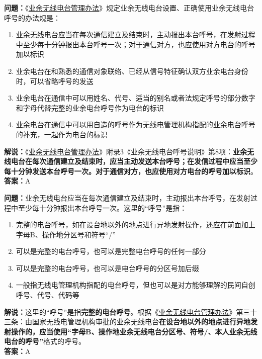 \textbf{问题：}《\href{https://www.miit.gov.cn/jgsj/zfs/bmgz/art/2020/art_147b69815b3641caad9047735f94c860.html}{业余无线电台管理办法}》规定业余无线电台设置、正确使用业余无线电台呼号的办法规是：
\begin{enumerate}[label=\Alph*), leftmargin=1cm]
	\item 业余无线电台应当在每次通信建立及结束时，主动报出本台呼号，在发射过程中至少每十分钟报出本台呼号一次；对于通信对方，也应使用对方电台的呼号加以标识
	\item 业余电台在和熟悉的通信对象联络、已经从信号特征确认双方业余电台身份时，可以省略呼号的发送
	\item 业余电台在通信中可以用姓名、代号、适当的别名或者法规定呼号的部分数字和字母代替完整的业余电台呼号作为电台的标识
	\item 业余电台在通信中可以用自造的呼号作为无线电管理机构指配的业余电台呼号的补充，一起作为电台的标识
\end{enumerate}
\textbf{解说：}《\href{https://www.miit.gov.cn/jgsj/zfs/bmgz/art/2020/art_147b69815b3641caad9047735f94c860.html}{业余无线电台管理办法}》附录3《业余无线电台呼号说明》第8项：\textbf{业余无线电台在每次通信建立及结束时，应当主动发送本台呼号；在发信过程中应当至少每十分钟发送本台呼号一次。对于通信对方，也应使用对方电台的呼号加以标识}。\\\textbf{答案：}A

\textbf{问题：}业余无线电台应当在每次通信建立及结束时，主动报出本台呼号，在发射过程中至少每十分钟报出本台呼号一次。这里的“呼号”是指：
\begin{enumerate}[label=\Alph*), leftmargin=1cm]
	\item 完整的电台呼号，如在设台地以外的地点进行异地发射操作，还应在前面加上字母B、操作地分区号和符号“/”
	\item 可以是完整的电台呼号，也可以是完整电台呼号的任何一部分
	\item 可以是完整的电台呼号，也可以是电台呼号的分区号加后缀
	\item 一般指无线电管理机构指配的电台呼号，但也可以是对方能够理解的民间自创呼号、代号、代码等
\end{enumerate}
\textbf{解说：}这里的“呼号”是指\textbf{完整的电台呼号}。根据《\href{https://www.miit.gov.cn/jgsj/zfs/bmgz/art/2020/art_147b69815b3641caad9047735f94c860.html}{业余无线电台管理办法}》第三十三条：由国家无线电管理机构审批的业余无线电台\textbf{在设台地以外的地点进行异地发射操作的，应当使用“字母B、操作地业余无线电台分区号、符号/、本人业余无线电台的呼号”}格式的呼号。\\\textbf{答案：}A

